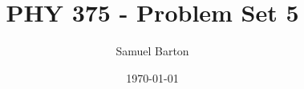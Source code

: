 \documentclass[12pt]{article}
\title{PHY 375 - Problem Set 5}
\author{Samuel Barton}
\date{\today}
\begin{document}
	
	\maketitle
	
	
	
	\pagebreak
	
	
	
\end{document}
